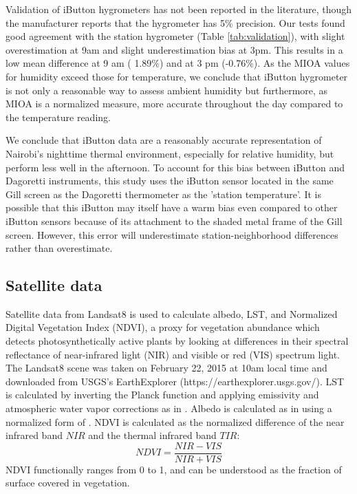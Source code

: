 Validation of iButton hygrometers has not been reported in the literature, though the manufacturer reports that the hygrometer has 5\% precision.  Our tests found good agreement with the station hygrometer (Table \ref{tab:validation}), with slight overestimation at 9am and slight underestimation bias at 3pm. This results in a low mean difference at 9 am ( 1.89\%) and at 3 pm (-0.76\%). As the MIOA values for humidity exceed those for temperature, we conclude that iButton hygrometer is not only a reasonable way to assess ambient humidity but furthermore, as MIOA is a normalized measure, more accurate throughout the day compared to the temperature reading. 

We conclude that iButton data are a reasonably accurate representation of Nairobi's nighttime thermal environment, especially for relative humidity, but perform less well in the afternoon. To account for this bias between iButton and Dagoretti instruments, this study uses the iButton sensor located in the same Gill screen as the Dagoretti thermometer as the 'station temperature'. It is possible that this iButton may itself have a warm bias even compared to other iButton sensors because of its attachment to the shaded metal frame of the Gill screen. However, this error will underestimate station-neighborhood differences rather than overestimate.   

\subsection{Satellite data}
Satellite data from Landsat8 is used to calculate albedo, LST, and Normalized Digital Vegetation Index (NDVI), a proxy for vegetation abundance which detects photosynthetically active plants by looking at differences in their spectral reflectance of near-infrared light (NIR) and visible or red (VIS) spectrum light. The Landsat8 scene was taken on February 22, 2015 at 10am local time and downloaded from USGS's EarthExplorer (https://earthexplorer.usgs.gov/). LST is calculated by inverting the Planck function and applying emissivity and atmospheric water vapor corrections as in \cite{jimenez2003generalized}. Albedo is calculated as in \cite{smith2010heat} using a normalized form of \cite{Liang2001}. NDVI is calculated as the normalized difference of the near infrared band $NIR$ and the thermal infrared band $TIR$:
\[NDVI = \frac{NIR-VIS}{NIR + VIS}\] 
NDVI functionally ranges from 0 to 1, and can be understood as the fraction of surface covered in vegetation.

